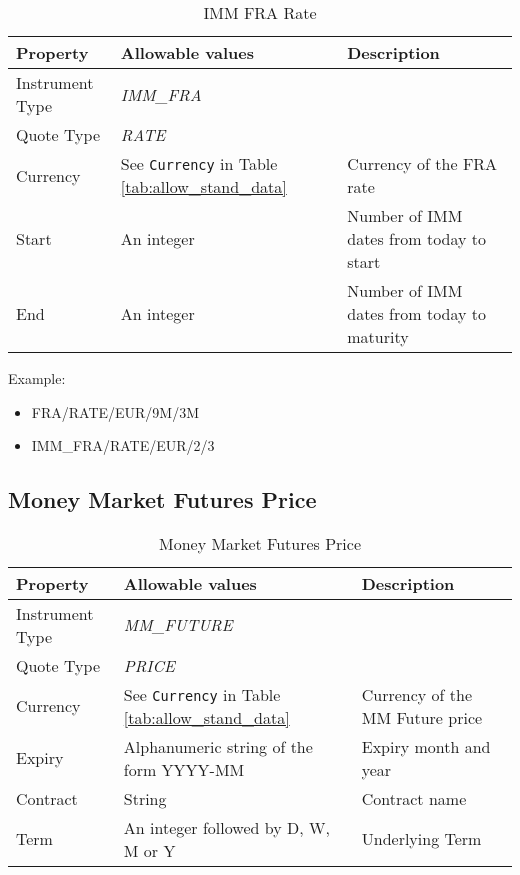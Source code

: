 \begin{table}[H]
\centering
  \begin{tabular}{|p{3.5cm}|p{3.5cm}|p{6.5cm}|}
  \hline
    {\bf Property} & {\bf Allowable values} & {\bf Description} \\ \hline
    Instrument Type & \emph{IMM\_FRA} & \\ \hline
    Quote Type & \emph{RATE} & \\ \hline
    Currency & See \lstinline!Currency! in Table \ref{tab:allow_stand_data} & Currency of the FRA rate\\ \hline
    Start & An integer & Number of IMM dates from today to start  \\ \hline
    End & An integer & Number of IMM dates from today to maturity\\ \hline
  \end{tabular}
  \caption{IMM FRA Rate}
  \label{tab:imm_fra_quote}
\end{table}

\medskip
Example:
\begin{itemize}
\item {FRA/RATE/EUR/9M/3M}
\item {IMM\_FRA/RATE/EUR/2/3}
\end{itemize}



\subsection{Money Market Futures Price}

\begin{table}[H]
\centering
  \begin{tabular}{|p{3cm}|p{4.5cm}|p{7cm}|}
  \hline
    {\bf Property} & {\bf Allowable values} & {\bf Description} \\ \hline
    Instrument Type & \emph{MM\_FUTURE} & \\ \hline
    Quote Type & \emph{PRICE} & \\ \hline
    Currency & See \lstinline!Currency! in Table \ref{tab:allow_stand_data}& Currency of the MM Future price\\ \hline
    Expiry & Alphanumeric string of the form YYYY-MM & Expiry month and year\\ \hline
    Contract & String & Contract name\\ \hline
    Term & An integer followed by D, W, M or Y & Underlying Term\\ \hline
  \end{tabular}
  \caption{Money Market Futures Price}
  \label{tab:mmfp_quote}
\end{table}

